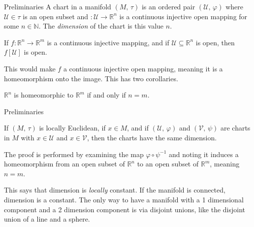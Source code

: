 \documentclass{beamer}
\begin{document}
    \begin{frame}{Preliminaries}
        A chart in a manifold $(M,\,\tau)$ is an ordered pair
        $(\mathcal{U},\,\varphi)$ where $\mathcal{U}\in\tau$ is an open subset
        and $\mathcal:\mathcal{U}\rightarrow\mathbb{R}^{n}$ is a continuous
        injective open mapping for some $n\in\mathbb{N}$. The \textit{dimension}
        of the chart is this value $n$.
        \begin{theorem}
            If $f:\mathbb{R}^{n}\rightarrow\mathbb{R}^{m}$ is a continuous
            injective mapping, and if $\mathcal{U}\subseteq\mathbb{R}^{n}$ is
            open, then $f[\mathcal{U}]$ is open.
        \end{theorem}
        This would make $f$ a continuous injective open mapping, meaning it is
        a homeomorphism onto the image. This has two corollaries.
        \begin{theorem}
            $\mathbb{R}^{n}$ is homeomorphic to $\mathbb{R}^{m}$ if and only if
            $n=m$.
        \end{theorem}
    \end{frame}
    \begin{frame}{Preliminaries}
        \begin{theorem}
            If $(M,\,\tau)$ is locally Euclidean, if $x\in{M}$, and if
            $(\mathcal{U},\,\varphi)$ and $(\mathcal{V},\,\psi)$ are charts in
            $M$ with $x\in\mathcal{U}$ and $x\in\mathcal{V}$, then the charts
            have the same dimension.
        \end{theorem}
        The proof is performed by examining the map $\varphi\circ\psi^{-1}$ and
        noting it induces a homeomorphism from an open subset of
        $\mathbb{R}^{n}$ to an open subset of $\mathbb{R}^{m}$, meaning $n=m$.
        \par\hfill\par
        This says that dimension is \textit{locally} constant. If the manifold
        is connected, dimension is a constant. The only way to have a manifold
        with a 1 dimensional component and a 2 dimension component is via
        disjoint unions, like the disjoint union of a line and a sphere.
    \end{frame}
\end{document}
